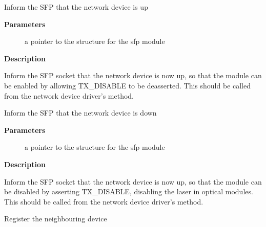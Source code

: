 \documentclass[a4paper,8pt,english]{sphinxmanual}
\begin{document}
\begin{fulllineitems}
\label{networking/kapi:c.sfp_upstream_start}
Inform the SFP that the network device is up

\end{fulllineitems}


\textbf{Parameters}
\begin{description}
\item[{}] \leavevmode
a pointer to the {\hyperref[networking/kapi:c.sfp_bus]{\emph{}}} structure for the sfp module

\end{description}

\textbf{Description}

Inform the SFP socket that the network device is now up, so that the
module can be enabled by allowing TX\_DISABLE to be deasserted. This
should be called from the network device driver's 
 method.

\begin{fulllineitems}
\label{networking/kapi:c.sfp_upstream_stop}
Inform the SFP that the network device is down

\end{fulllineitems}


\textbf{Parameters}
\begin{description}
\item[{}] \leavevmode
a pointer to the {\hyperref[networking/kapi:c.sfp_bus]{\emph{}}} structure for the sfp module

\end{description}

\textbf{Description}

Inform the SFP socket that the network device is now up, so that the
module can be disabled by asserting TX\_DISABLE, disabling the laser
in optical modules. This should be called from the network device
driver's   method.

\begin{fulllineitems}
\label{networking/kapi:c.sfp_register_upstream}
Register the neighbouring device

\end{fulllineitems}
\end{document}
